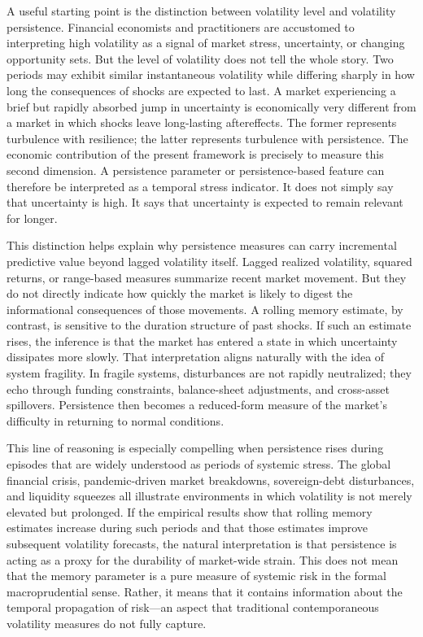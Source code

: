 \documentclass[12pt]{article}
\begin{document}
A useful starting point is the distinction between volatility level and volatility persistence. Financial economists and practitioners are accustomed to interpreting high volatility as a signal of market stress, uncertainty, or changing opportunity sets. But the level of volatility does not tell the whole story. Two periods may exhibit similar instantaneous volatility while differing sharply in how long the consequences of shocks are expected to last. A market experiencing a brief but rapidly absorbed jump in uncertainty is economically very different from a market in which shocks leave long-lasting aftereffects. The former represents turbulence with resilience; the latter represents turbulence with persistence. The economic contribution of the present framework is precisely to measure this second dimension. A persistence parameter or persistence-based feature can therefore be interpreted as a temporal stress indicator. It does not simply say that uncertainty is high. It says that uncertainty is expected to remain relevant for longer.

This distinction helps explain why persistence measures can carry incremental predictive value beyond lagged volatility itself. Lagged realized volatility, squared returns, or range-based measures summarize recent market movement. But they do not directly indicate how quickly the market is likely to digest the informational consequences of those movements. A rolling memory estimate, by contrast, is sensitive to the duration structure of past shocks. If such an estimate rises, the inference is that the market has entered a state in which uncertainty dissipates more slowly. That interpretation aligns naturally with the idea of system fragility. In fragile systems, disturbances are not rapidly neutralized; they echo through funding constraints, balance-sheet adjustments, and cross-asset spillovers. Persistence then becomes a reduced-form measure of the market's difficulty in returning to normal conditions.

This line of reasoning is especially compelling when persistence rises during episodes that are widely understood as periods of systemic stress. The global financial crisis, pandemic-driven market breakdowns, sovereign-debt disturbances, and liquidity squeezes all illustrate environments in which volatility is not merely elevated but prolonged. If the empirical results show that rolling memory estimates increase during such periods and that those estimates improve subsequent volatility forecasts, the natural interpretation is that persistence is acting as a proxy for the durability of market-wide strain. This does not mean that the memory parameter is a pure measure of systemic risk in the formal macroprudential sense. Rather, it means that it contains information about the temporal propagation of risk---an aspect that traditional contemporaneous volatility measures do not fully capture.
\end{document}
